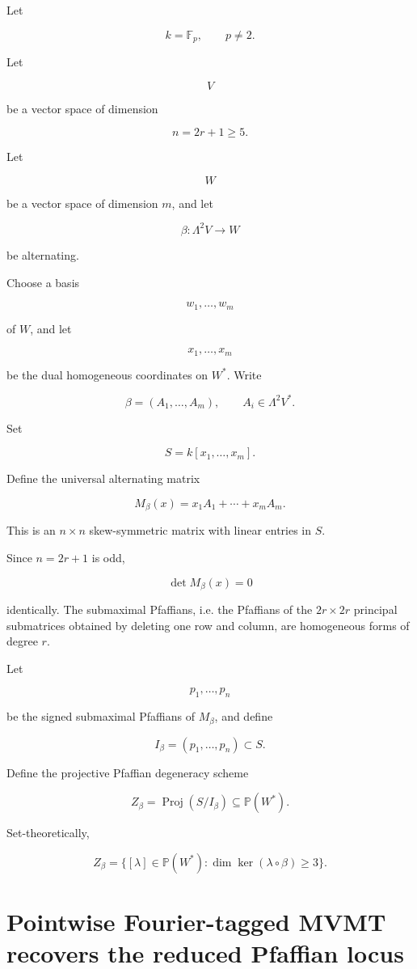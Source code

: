 \documentclass[11pt]{article}
\begin{document}
Let

\[
k=\mathbb F_p,\qquad p\neq2.
\]

Let

\[
V
\]

be a vector space of dimension

\[
n=2r+1\ge5.
\]

Let

\[
W
\]

be a vector space of dimension $m$, and let

\[
\beta:\Lambda^2 V\to W
\]

be alternating.

Choose a basis

\[
w_1,\ldots,w_m
\]

of $W$, and let

\[
x_1,\ldots,x_m
\]

be the dual homogeneous coordinates on $W^*$. Write

\[
\beta=(A_1,\ldots,A_m),
\qquad
A_i\in\Lambda^2V^*.
\]

Set

\[
S=k[x_1,\ldots,x_m].
\]

Define the universal alternating matrix

\[
M_\beta(x)=x_1A_1+\cdots+x_mA_m.
\]

This is an $n\times n$ skew-symmetric matrix with linear entries in $S$.

Since $n=2r+1$ is odd,

\[
\det M_\beta(x)=0
\]

identically. The submaximal Pfaffians, i.e. the Pfaffians of the $2r\times2r$ principal submatrices obtained by deleting one row and column, are homogeneous forms of degree $r$.

Let

\[
p_1,\ldots,p_n
\]

be the signed submaximal Pfaffians of $M_\beta$, and define

\[
I_\beta=(p_1,\ldots,p_n)\subset S.
\]

Define the projective Pfaffian degeneracy scheme

\[
Z_\beta=\operatorname{Proj}(S/I_\beta)
\subseteq \mathbb P(W^*).
\]

Set-theoretically,

\[
Z_\beta
=
\{[\lambda]\in\mathbb P(W^*):\dim\ker(\lambda\circ\beta)\ge3\}.
\]

\section{Pointwise Fourier-tagged MVMT recovers the reduced Pfaffian locus}
\end{document}
